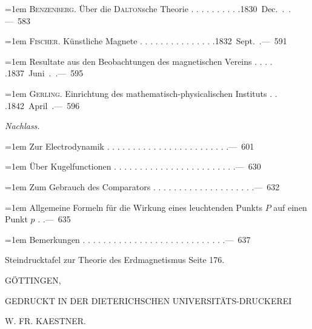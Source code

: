 \noindent\hangindent=1em \textsc{Benzenberg.} Über die \textsc{Dalton}sche Theorie . . . . . . . . . .\unskip\hspace{1em plus 1fill}\mbox{1830 Dec. . .\quad — 583}\par\smallskip
\noindent\hangindent=1em \textsc{Fischer.} Künstliche Magnete . . . . . . . . . . . . . . .\unskip\hspace{1em plus 1fill}\mbox{1832 Sept. .\quad — 591}\par\smallskip
\noindent\hangindent=1em Resultate aus den Beobachtungen des magnetischen Vereins . . . . .\unskip\hspace{1em plus 1fill}\mbox{1837 Juni . .\quad — 595}\par\smallskip
\noindent\hangindent=1em \textsc{Gerling.} Einrichtung des mathematisch-physicalischen Instituts . . .\unskip\hspace{1em plus 1fill}\mbox{1842 April .\quad — 596}\par\smallskip
\par{}\medskip\noindent\textit{Nachlass.}\par\smallskip
\noindent\hangindent=1em Zur Electrodynamik . . . . . . . . . . . . . . . . . . . . . . . .\unskip\hspace{1em plus 1fill}\mbox{\quad — 601}\par\smallskip
\noindent\hangindent=1em Über Kugelfunctionen . . . . . . . . . . . . . . . . . . . . . . . .\unskip\hspace{1em plus 1fill}\mbox{\quad — 630}\par\smallskip
\noindent\hangindent=1em Zum Gebrauch des Comparators . . . . . . . . . . . . . . . . . . . .\unskip\hspace{1em plus 1fill}\mbox{\quad — 632}\par\smallskip
\noindent\hangindent=1em Allgemeine Formeln für die Wirkung eines leuchtenden Punkts $P$ auf einen Punkt $p$ . .\unskip\hspace{1em plus 1fill}\mbox{\quad — 635}\par\smallskip
\noindent\hangindent=1em Bemerkungen . . . . . . . . . . . . . . . . . . . . . . . . . . . .\unskip\hspace{1em plus 1fill}\mbox{\quad — 637}\par\smallskip
\par\medskip\noindent Steindrucktafel zur Theorie des Erdmagnetismus Seite 176.
\endgroup

\bigskip
\begin{center}
GÖTTINGEN,\par
\small GEDRUCKT IN DER DIETERICHSCHEN UNIVERSITÄTS-DRUCKEREI\par
W. FR. KAESTNER.
\end{center}
